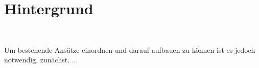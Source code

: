 \section{Hintergrund}
\label{sec-2}
\begin{center}
	\\
\end{center}
Um bestehende Ansätze einordnen und darauf aufbauen zu können ist es jedoch notwendig, zunächst. ...


